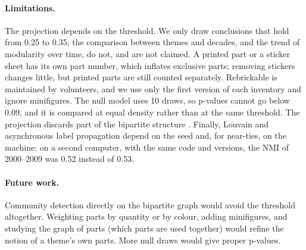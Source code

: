 \documentclass[10pt,a4paper]{article}
\begin{document}
\paragraph{Limitations.} The projection depends on the threshold. We only
draw conclusions that hold from 0.25 to 0.35; the comparison between themes
and decades, and the trend of modularity over time, do not, and are not
claimed. A printed part or a sticker sheet has its own part number, which
inflates exclusive parts; removing stickers changes little, but printed parts
are still counted separately. Rebrickable is maintained by volunteers, and we
use only the first version of each inventory and ignore minifigures. The null
model uses 10 draws, so p-values cannot go below 0.09, and it is compared at
equal density rather than at the same threshold. The projection discards part
of the bipartite structure \cite{barber2007}. Finally, Louvain and
asynchronous label propagation depend on the seed and, for near-ties, on the
machine: on a second computer, with the same code and versions, the NMI of
2000--2009 was 0.52 instead of 0.53.

\paragraph{Future work.} Community detection directly on the bipartite graph
\cite{barber2007} would avoid the threshold altogether. Weighting parts by
quantity or by colour, adding minifigures, and studying the graph of parts
(which parts are used together) would refine the notion of a theme's own
parts. More null draws would give proper p-values.

{\small


}
\end{document}
